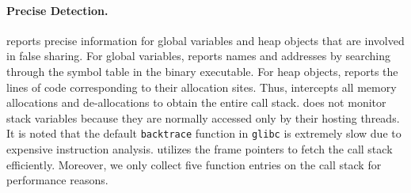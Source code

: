 \paragraph{Precise Detection.} \Cheetah{} reports precise information for global variables and heap objects that are involved in false sharing. For global variables, \Cheetah{} reports names and addresses by searching through the symbol table in the binary executable. For heap objects, \Cheetah{} reports the lines of code corresponding to their allocation sites. Thus, \Cheetah{} intercepts all memory allocations and de-allocations to obtain the entire call stack. 
\cheetah{} does not monitor stack variables because they are normally accessed only by their hosting threads. It is noted that the default \texttt{backtrace} function in \texttt{glibc} is extremely slow due to expensive instruction analysis. \cheetah{} utilizes the frame pointers to fetch the call stack efficiently. Moreover, we only collect five function entries on the call stack for performance reasons.

 
